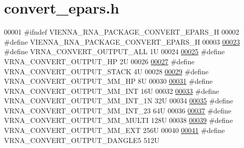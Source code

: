 \hypertarget{convert__epars_8h_source}{}\section{convert\+\_\+epars.\+h}
\label{convert__epars_8h_source}

\begin{DoxyCode}
00001 \textcolor{preprocessor}{#ifndef VIENNA\_RNA\_PACKAGE\_CONVERT\_EPARS\_H}
00002 \textcolor{preprocessor}{#define VIENNA\_RNA\_PACKAGE\_CONVERT\_EPARS\_H}
00003 
\hyperlink{group__energy__parameters__convert_ga8dc6aee5a806c49b71557152f9616bc4}{00023} \textcolor{preprocessor}{#define VRNA\_CONVERT\_OUTPUT\_ALL           1U}
00024 
\hyperlink{group__energy__parameters__convert_gaf66fe2cb11dfcfd32d791049c254a8a4}{00025} \textcolor{preprocessor}{#define VRNA\_CONVERT\_OUTPUT\_HP            2U}
00026 
\hyperlink{group__energy__parameters__convert_gad23522d63f8d4c50d5a5deee9bee3ef2}{00027} \textcolor{preprocessor}{#define VRNA\_CONVERT\_OUTPUT\_STACK         4U}
00028 
\hyperlink{group__energy__parameters__convert_gaa892c7b4957459090f3e08da298cc347}{00029} \textcolor{preprocessor}{#define VRNA\_CONVERT\_OUTPUT\_MM\_HP         8U}
00030 
\hyperlink{group__energy__parameters__convert_ga4ff223fb1f9c62cd92d9ab811ad03d55}{00031} \textcolor{preprocessor}{#define VRNA\_CONVERT\_OUTPUT\_MM\_INT        16U}
00032 
\hyperlink{group__energy__parameters__convert_gaf5d3743219f83c6348155cd81e755bbb}{00033} \textcolor{preprocessor}{#define VRNA\_CONVERT\_OUTPUT\_MM\_INT\_1N     32U}
00034 
\hyperlink{group__energy__parameters__convert_ga78382ec622ba99e0ac2262317bdd7316}{00035} \textcolor{preprocessor}{#define VRNA\_CONVERT\_OUTPUT\_MM\_INT\_23     64U}
00036 
\hyperlink{group__energy__parameters__convert_gae67af9f1cdf7baf2865481282a5d1034}{00037} \textcolor{preprocessor}{#define VRNA\_CONVERT\_OUTPUT\_MM\_MULTI      128U}
00038 
\hyperlink{group__energy__parameters__convert_gaf14ead7ef1fdbe725ade653750fc51e3}{00039} \textcolor{preprocessor}{#define VRNA\_CONVERT\_OUTPUT\_MM\_EXT        256U}
00040 
\hyperlink{group__energy__parameters__convert_ga036ffd996d8c8a9acf631760dd1da24b}{00041} \textcolor{preprocessor}{#define VRNA\_CONVERT\_OUTPUT\_DANGLE5       512U}

\end{DoxyCode}
